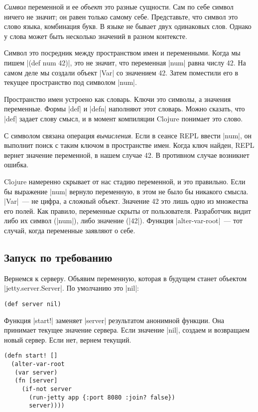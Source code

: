 \emph{Символ} переменной и ее \emph{объект} это разные сущности. Сам по себе
символ ничего не значит; он равен только самому себе. Представьте, что символ
это слово языка, комбинация букв. В языке не бывает двух одинаковых слов. Однако
у слова может быть несколько значений в разном контексте.

Символ это посредник между пространством имен и переменными. Когда мы пишем
\spverb|(def num 42)|, это не значит, что переменная \spverb|num| равна числу
42. На самом деле мы создали объект \spverb|Var| со значением 42. Затем
поместили его в текущее пространство под символом \spverb|num|.

Пространство имен устроено как словарь. Ключи это символы, а значения
переменные. Формы \spverb|def| и \spverb|defn| наполняют этот словарь. Можно
сказать, что \spverb|def| задает слову смысл, и в момент компиляции Clojure
понимает это слово.

С символом связана операция \emph{вычисления}. Если в сеансе REPL ввести
\spverb|num|, он выполнит поиск с таким ключом в пространстве имен. Когда ключ
найден, REPL вернет значение переменной, в нашем случае 42. В противном случае
возникнет ошибка.

Clojure намеренно скрывает от нас стадию переменной, и это правильно. Если бы
выражение \spverb|num| вернуло переменную, в этом не было бы никакого
смысла. \spverb|Var|~--- не цифра, а сложный объект. Значение 42 это лишь одно
из множества его полей. Как правило, переменные скрыты от
пользователя. Разработчик видит либо их символ (\spverb|num|), либо значение
(\spverb|42|). Функция \spverb|alter-var-root|~--- тот случай, когда переменные
заявляют о себе.

\subsection{Запуск по требованию}

Вернемся к серверу. Объявим переменную, которая в будущем станет объектом
\spverb|jetty.server.Server|. По умолчанию это \spverb|nil|:

\begin{verbatim}
(def server nil)
\end{verbatim}

Функция \spverb|start!| заменяет \spverb|server| результатом анонимной
функции. Она принимает текущее значение сервера. Если значение \spverb|nil|,
создаем и возвращаем новый сервер. Если нет, вернем текущий.

\begin{verbatim}
(defn start! []
  (alter-var-root
   (var server)
   (fn [server]
     (if-not server
       (run-jetty app {:port 8080 :join? false})
       server))))
\end{verbatim}

